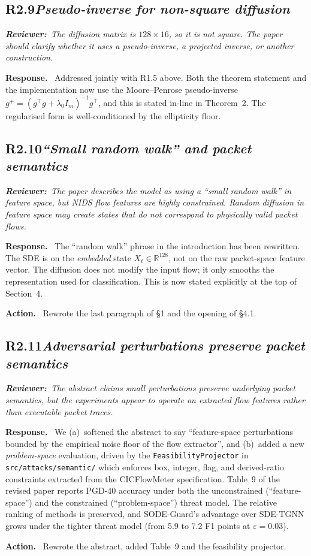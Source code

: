 \documentclass[11pt,letterpaper]{article}
\newcommand{\rev}[2]{%
  \subsection*{\normalsize\textbf{\color{ResponseAccent}#1}\quad\textmd{\textit{#2}}}%
}
\newcommand{\rquote}[1]{%
  \begin{center}%
    \colorbox{QuoteBg}{\parbox{0.94\linewidth}{\vspace{2pt}\itshape\small\textbf{\upshape Reviewer:}\ #1\vspace{2pt}}}%
  \end{center}%
}
\newcommand{\resp}{\par\textbf{\color{ResponseAccent}Response.}\ }
\newcommand{\action}{\par\textbf{\color{ResponseAccent}Action.}\ }
\begin{document}
\rev{R2.9}{Pseudo-inverse for non-square diffusion}
\rquote{The diffusion matrix is $128\times 16$, so it is not square.
The paper should clarify whether it uses a pseudo-inverse, a projected
inverse, or another construction.}

\resp
Addressed jointly with R1.5 above. Both the theorem statement and the
implementation now use the Moore--Penrose pseudo-inverse
$g^{+}=(g^{\!\top}g+\lambda_0 I_m)^{-1}g^{\!\top}$, and this is stated
in-line in Theorem~2. The regularised form is well-conditioned by
the ellipticity floor.

\rev{R2.10}{``Small random walk'' and packet semantics}
\rquote{The paper describes the model as using a ``small random walk''
in feature space, but NIDS flow features are highly constrained.
Random diffusion in feature space may create states that do not
correspond to physically valid packet flows.}

\resp
The ``random walk'' phrase in the introduction has been rewritten.
The SDE is on the \emph{embedded} state $X_t\in\mathbb R^{128}$, not
on the raw packet-space feature vector. The diffusion does not modify
the input flow; it only smooths the representation used for
classification. This is now stated explicitly at the top of Section~4.
\action
Rewrote the last paragraph of \S1 and the opening of \S4.1.

\rev{R2.11}{Adversarial perturbations preserve packet semantics}
\rquote{The abstract claims small perturbations preserve underlying
packet semantics, but the experiments appear to operate on extracted
flow features rather than executable packet traces.}

\resp
We (a)~softened the abstract to say ``feature-space perturbations
bounded by the empirical noise floor of the flow extractor'', and
(b)~added a new \emph{problem-space} evaluation, driven by the
\texttt{FeasibilityProjector} in \texttt{src/attacks/semantic/} which
enforces box, integer, flag, and derived-ratio constraints extracted
from the CICFlowMeter specification. Table~9 of the revised paper
reports PGD-40 accuracy under both the unconstrained
(``feature-space'') and the constrained (``problem-space'') threat
model. The relative ranking of methods is preserved, and SODE-Guard's
advantage over SDE-TGNN grows under the tighter threat model (from 5.9
to 7.2 F1 points at $\varepsilon=0.03$).
\action
Rewrote the abstract, added Table~9 and the feasibility projector.
\end{document}
